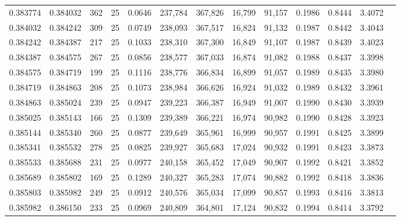 \begin{tabular}{rrrrrrrrrrrrr}
0.383774 & 0.384032 &   362 &  25 &                                     0.0646 & 237,784 & 367,826 &  16,799 &  91,157 & 0.1986 & 0.8444 & 3.4072 \\
0.384032 & 0.384242 &   309 &  25 &                                     0.0749 & 238,093 & 367,517 &  16,824 &  91,132 & 0.1987 & 0.8442 & 3.4043 \\
0.384242 & 0.384387 &   217 &  25 &                                     0.1033 & 238,310 & 367,300 &  16,849 &  91,107 & 0.1987 & 0.8439 & 3.4023 \\
0.384387 & 0.384575 &   267 &  25 &                                     0.0856 & 238,577 & 367,033 &  16,874 &  91,082 & 0.1988 & 0.8437 & 3.3998 \\
0.384575 & 0.384719 &   199 &  25 &                                     0.1116 & 238,776 & 366,834 &  16,899 &  91,057 & 0.1989 & 0.8435 & 3.3980 \\
0.384719 & 0.384863 &   208 &  25 &                                     0.1073 & 238,984 & 366,626 &  16,924 &  91,032 & 0.1989 & 0.8432 & 3.3961 \\
0.384863 & 0.385024 &   239 &  25 &                                     0.0947 & 239,223 & 366,387 &  16,949 &  91,007 & 0.1990 & 0.8430 & 3.3939 \\
0.385025 & 0.385143 &   166 &  25 &                                     0.1309 & 239,389 & 366,221 &  16,974 &  90,982 & 0.1990 & 0.8428 & 3.3923 \\
0.385144 & 0.385340 &   260 &  25 &                                     0.0877 & 239,649 & 365,961 &  16,999 &  90,957 & 0.1991 & 0.8425 & 3.3899 \\
0.385341 & 0.385532 &   278 &  25 &                                     0.0825 & 239,927 & 365,683 &  17,024 &  90,932 & 0.1991 & 0.8423 & 3.3873 \\
0.385533 & 0.385688 &   231 &  25 &                                     0.0977 & 240,158 & 365,452 &  17,049 &  90,907 & 0.1992 & 0.8421 & 3.3852 \\
0.385689 & 0.385802 &   169 &  25 &                                     0.1289 & 240,327 & 365,283 &  17,074 &  90,882 & 0.1992 & 0.8418 & 3.3836 \\
0.385803 & 0.385982 &   249 &  25 &                                     0.0912 & 240,576 & 365,034 &  17,099 &  90,857 & 0.1993 & 0.8416 & 3.3813 \\
0.385982 & 0.386150 &   233 &  25 &                                     0.0969 & 240,809 & 364,801 &  17,124 &  90,832 & 0.1994 & 0.8414 & 3.3792 \\

\end{tabular}
